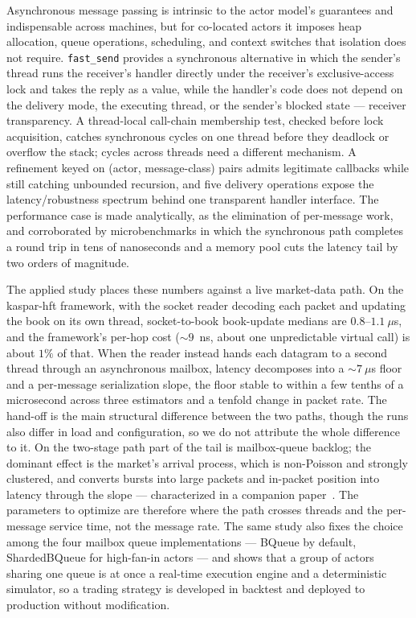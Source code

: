 \documentclass[11pt]{article}
\newcommand{\fs}{\texttt{fast\_send}}
\begin{document}
Asynchronous message passing is intrinsic to the actor model's guarantees and
indispensable across machines, but for co-located actors it imposes heap
allocation, queue operations, scheduling, and context switches that isolation
does not require. \fs{} provides a synchronous alternative in which the sender's
thread runs the receiver's handler directly under the receiver's exclusive-access
lock and takes the reply as a value, while the handler's code does not depend on
the delivery mode, the executing thread, or the sender's blocked state ---
receiver transparency. A thread-local call-chain membership test, checked before
lock acquisition, catches synchronous cycles on one thread before they deadlock
or overflow the stack; cycles across threads need a different mechanism. A
refinement keyed on (actor, message-class) pairs admits legitimate callbacks
while still catching unbounded recursion, and five delivery operations expose the
latency/robustness spectrum behind one transparent handler interface. The performance case is made analytically, as the elimination of
per-message work, and corroborated by microbenchmarks in which the synchronous
path completes a round trip in tens of nanoseconds and a memory pool cuts the
latency tail by two orders of magnitude.

The applied study places these numbers against a live market-data path. On the
kaspar-hft framework, with the socket reader decoding each packet and updating
the book on its own thread, socket-to-book book-update medians are
$0.8$--$1.1~\mu$s, and the framework's per-hop cost ($\sim\!9$~ns, about one
unpredictable virtual call) is about $1\%$ of that. When the reader instead hands
each datagram to a second thread through an asynchronous mailbox, latency
decomposes into a $\sim\!7~\mu$s floor and a per-message serialization slope, the
floor stable to within a few tenths of a microsecond across three estimators and
a tenfold change in packet rate. The hand-off is the main structural difference
between the two paths, though the runs also differ in load and configuration, so
we do not attribute the whole difference to it. On the two-stage path part of
the tail is mailbox-queue backlog; the dominant effect is the market's
arrival process, which is non-Poisson and strongly clustered, and
converts bursts into large packets and in-packet
position into latency through the slope --- characterized in a companion
paper~\cite{mdarrival}. The parameters to optimize are therefore where the path
crosses threads and the per-message service time, not the message rate. The same study
also fixes the choice among the four mailbox queue implementations --- BQueue by
default, ShardedBQueue for high-fan-in actors --- and shows that a group of actors
sharing one queue is at once a real-time execution engine and a deterministic
simulator, so a trading strategy is developed in backtest and deployed to
production without modification.
\end{document}
